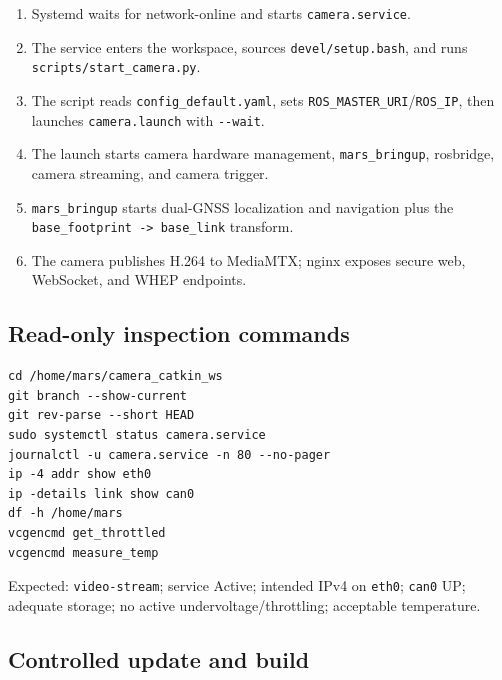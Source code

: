 \documentclass[
  10pt,
  letterpaper,
  openany]{report}
\providecommand{\tightlist}{%
  \setlength{\itemsep}{0pt}\setlength{\parskip}{0pt}}
\begin{document}
\begin{enumerate}
\tightlist
\item
  Systemd waits for network-online and starts \texttt{camera.service}.
\item
  The service enters the workspace, sources \texttt{devel/setup.bash},
  and runs \texttt{scripts/start\_camera.py}.
\item
  The script reads \texttt{config\_default.yaml}, sets
  \texttt{ROS\_MASTER\_URI}/\texttt{ROS\_IP}, then launches
  \texttt{camera.launch} with \texttt{-\/-wait}.
\item
  The launch starts camera hardware management, \texttt{mars\_bringup},
  rosbridge, camera streaming, and camera trigger.
\item
  \texttt{mars\_bringup} starts dual-GNSS localization and navigation
  plus the \texttt{base\_footprint\ -\textgreater{}\ base\_link}
  transform.
\item
  The camera publishes H.264 to MediaMTX; nginx exposes secure web,
  WebSocket, and WHEP endpoints.
\end{enumerate}

\subsection{Read-only inspection
commands}\label{read-only-inspection-commands}

\begin{verbatim}
cd /home/mars/camera_catkin_ws
git branch --show-current
git rev-parse --short HEAD
sudo systemctl status camera.service
journalctl -u camera.service -n 80 --no-pager
ip -4 addr show eth0
ip -details link show can0
df -h /home/mars
vcgencmd get_throttled
vcgencmd measure_temp
\end{verbatim}

Expected: \texttt{video-stream}; service Active; intended IPv4 on
\texttt{eth0}; \texttt{can0} UP; adequate storage; no active
undervoltage/throttling; acceptable temperature.

\subsection{Controlled update and
build}\label{controlled-update-and-build}
\end{document}
